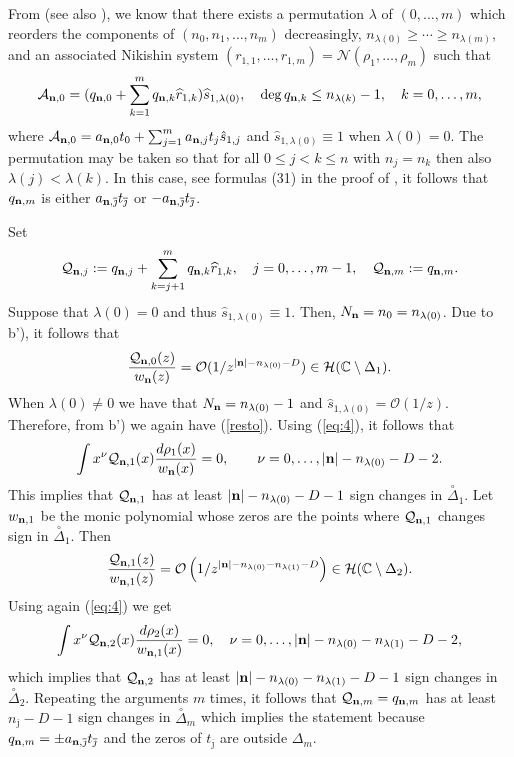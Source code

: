 \documentclass[10pt,a4paper]{article}
\theoremstyle{definition}
\theoremstyle{remark}
\numberwithin{equation}{section}
\begin{document}
From  \cite[Theorem 1.3]{FL4} (see also \cite[Theorem 3.2]{FL4II}), we know that  there exists a permutation $\lambda$ of $(0,\ldots,m)$ which reorders the components of $(n_0,n_1,\ldots,n_m)$ decreasingly, $n_{\lambda(0)} \geq \cdots \geq n_{\lambda(m)},$ and an associated Nikishin system $(r_{1,1},\ldots,r_{1,m}) = {\mathcal{N}}(\rho_{1},\ldots,\rho_m)$ such that
\[  \mathcal{A}_{{\bf n},0} = (q_{{\bf n},0} + \sum_{k=1}^m q_{{\bf n},k} \widehat{r}_{1,k})\widehat{s}_{1,\lambda(0)}, \quad \deg q_{{\bf n},k} \leq n_{\lambda(k)} -1, \quad k=0,\ldots,m,
\]
where $\mathcal{A}_{{\bf n},0} = a_{{{\bf n}},0} t_0 +\sum_{j=1}^m a_{{{\bf n}},j}   t_j \hat{s}_{1,j}  $ and $\widehat{s}_{1,\lambda(0)} \equiv 1$ when $\lambda(0) = 0$.
The permutation may be taken so that for all $0 \leq j <k \leq n$ with $n_j = n_k$ then also $\lambda(j) < \lambda(k)$. In this case,  see formulas (31) in the proof of \cite[Lemma 2.3]{FL4}, it follows that $q_{{\bf n},m}$ is either $a_{{\bf n},\overline{\jmath}}t_{\overline{\jmath}}$ or $-a_{{\bf n},\overline{\jmath}}t_{\overline{\jmath}}$.

Set
\[\mathcal{Q}_{{\bf n},j} := q_{{\bf n},j} + \sum_{k=j+1}^m q_{{\bf n},k} \widehat{r}_{1,k}, \quad j=0,\ldots,m-1, \quad \mathcal{Q}_{{\bf n},m} := q_{{\bf n},m}.\]
Suppose that $\lambda(0) = 0$ and thus $\widehat{s}_{1,\lambda(0)} \equiv 1$. Then, $N_{\bf n} = n_0 = n_{\lambda(0)}$. Due to b'), it follows that
\begin{equation} \label{resto} \frac{\mathcal{Q}_{{\bf n},0}(z)}{w_{\bf n}(z)} = \mathcal{O}(1/z^{|{\bf n}| - n_{\lambda(0)} -D}) \in \mathcal{H}(\mathbb{C}\setminus \Delta_1).
\end{equation}
When $\lambda(0) \neq 0$ we have that $N_{\bf n} = n_{\lambda(0)} - 1$ and $\widehat{s}_{1,\lambda(0)} = \mathcal{O}(1/z)$. Therefore, from b') we again have (\ref{resto}). Using (\ref{eq:4}), it follows that
\[ \int x^{\nu}  \mathcal{Q}_{{\bf n},1}(x)  \frac{d\rho_1(x)}{w_{\bf n}(x)} = 0, \qquad \nu = 0,\ldots, |{\bf n}| - n_{\lambda(0)}- D -2.
\]
This implies that $\mathcal{Q}_{{\bf n},1}$ has at least $|{\bf n}|  - n_{\lambda(0)}- D -1$ sign changes in $\stackrel{\circ}{\Delta}_1$. Let $w_{{\bf n},1}$ be the monic polynomial whose zeros are the points where $\mathcal{Q}_{{\bf n},1}$ changes sign in $\stackrel{\circ}{\Delta}_1$. Then
\[ \frac{\mathcal{Q}_{{\bf n},1}(z)}{w_{{\bf n},1}(z)} = \mathcal{O}\left(1/z^{|{\bf n}|  - n_{\lambda(0)} -n_{\lambda(1)} - D}\right) \in \mathcal{H}(\mathbb{C} \setminus \Delta_2).
\]
Using again (\ref{eq:4}) we get
\[ \int x^{\nu}  \mathcal{Q}_{{\bf n},2}(x)  \frac{d\rho_2(x)}{w_{{\bf n},1}(x)} = 0, \quad \nu = 0,\ldots, |{\bf n}|  - n_{\lambda(0)}- n_{\lambda(1)} - D -2,
\]
which implies that $\mathcal{Q}_{{\bf n},2}$ has at least $|{\bf n}|  - n_{\lambda(0)}- n_{\lambda(1)} - D -1$ sign changes in $\stackrel{\circ}{\Delta}_2$. Repeating the arguments $m$ times, it follows that $\mathcal{Q}_{{\bf n},m} = q_{{\bf n},m}$ has at least $n_{\overline{\jmath}} - D -1$ sign changes in $\stackrel{\circ}{\Delta}_m$ which implies the statement because $q_{{\bf n},m} = \pm a_{{\bf n},\overline{\jmath}}t_{\overline{\jmath}}$ and the zeros of $t_{\overline{\jmath}}$ are outside $\Delta_m$.
\end{document}
